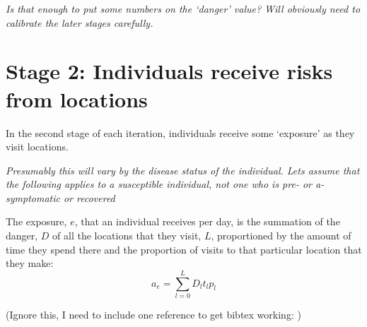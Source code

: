 \documentclass{article}
\begin{document}
\textit{Is that enough to put some numbers on the `danger' value? Will obviously need to calibrate the later stages carefully.}

\section{Stage 2: Individuals receive risks from locations}

In the second stage of each iteration, individuals receive some `exposure' as they visit locations.

\textit{Presumably this will vary by the disease status of the individual. Lets assume that the following applies to a susceptible individual, not one who is pre- or a-symptomatic or recovered}

The exposure, $e$, that an individual receives per day, is the summation of the danger, $D$ of all the locations that they visit, $L$, proportioned by the amount of time they spend there and the proportion of visits to that particular location that they make:
\begin{equation}
  a_e = \sum_{l=0}^{L} D_l t_l p_l 
\end{equation}




\newpage
(Ignore this, I need to include one reference to get bibtex working: \cite{hellewell_feasibility_2020})



\end{document}
